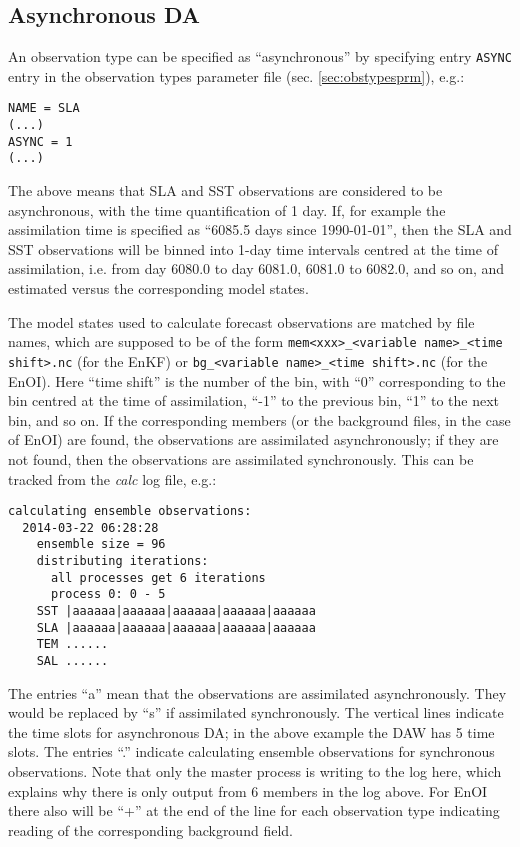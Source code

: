 \documentclass[11pt]{report}
\begin{document}
\subsection{Asynchronous DA}
\label{sec:async}

An observation type can be specified as ``asynchronous'' by specifying entry \verb|ASYNC| entry in the observation types parameter file (sec. \ref{sec:obstypesprm}), e.g.:
\begin{Verbatim}[frame=single,fontsize=\footnotesize]
NAME = SLA
(...)
ASYNC = 1
(...)
\end{Verbatim}
The above means that SLA and SST observations are considered to be asynchronous, with the time quantification of 1 day.
If, for example the assimilation time is specified as ``6085.5 days since 1990-01-01'', then the SLA and SST observations will be binned into 1-day time intervals centred at the time of assimilation, i.e. from day 6080.0 to day 6081.0, 6081.0 to 6082.0, and so on, and estimated versus the corresponding model states.

The model states used to calculate forecast observations are matched by file names, which are supposed to be of the form \verb|mem<xxx>_<variable name>_<time shift>.nc| (for the EnKF) or \verb|bg_<variable name>_<time shift>.nc| (for the EnOI).
Here ``time shift'' is the number of the bin, with ``0'' corresponding to the bin centred at the time of assimilation, ``-1'' to the previous bin, ``1'' to the next bin, and so on.
If the corresponding members (or the background files, in the case of EnOI) are found, the observations are assimilated asynchronously; if they are not found, then the observations are assimilated synchronously.
This can be tracked from the \emph{calc} log file, e.g.:
\begin{Verbatim}[frame=single,fontsize=\footnotesize]
  calculating ensemble observations:
  2014-03-22 06:28:28
    ensemble size = 96
    distributing iterations:
      all processes get 6 iterations
      process 0: 0 - 5
    SST |aaaaaa|aaaaaa|aaaaaa|aaaaaa|aaaaaa
    SLA |aaaaaa|aaaaaa|aaaaaa|aaaaaa|aaaaaa
    TEM ......
    SAL ......
\end{Verbatim}
The entries ``a'' mean that the observations are assimilated asynchronously.
They would be replaced by ``s'' if assimilated synchronously.
The vertical lines indicate the time slots for asynchronous DA; in the above example the DAW has 5 time slots.
The entries ``.'' indicate calculating ensemble observations for synchronous observations.
Note that only the master process is writing to the log here, which explains why there is only output from 6 members in the log above.
For EnOI there also will be ``+'' at the end of the line for each observation type indicating reading of the corresponding background field.
\end{document}
